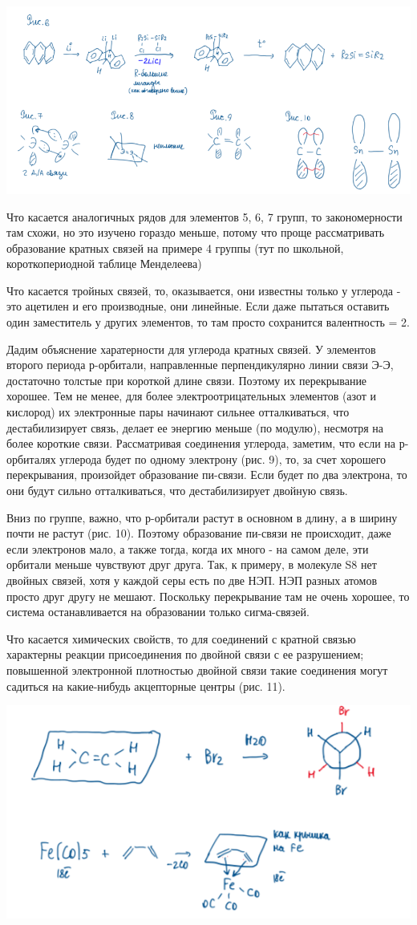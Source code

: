\includegraphics{images/14v3.png}

Что касается аналогичных рядов для элементов 5, 6, 7 групп, то закономерности там схожи, но это изучено гораздо меньше, потому что проще рассматривать образование кратных связей на
примере 4 группы (тут по школьной, короткопериодной таблице Менделеева)

Что касается тройных связей, то, оказывается, они известны только у углерода - это ацетилен и его производные, они линейные. Если даже пытаться оставить один заместитель у других
элементов, то там просто сохранится валентность = 2.

Дадим объяснение харатерности для углерода кратных связей. У элементов второго периода р-орбитали, направленные перпендикулярно линии связи Э-Э, достаточно толстые при короткой длине
связи. Поэтому их перекрывание хорошее. Тем не менее, для более электроотрицательных элементов (азот и кислород) их электронные пары начинают сильнее отталкиваться, что
дестабилизирует связь, делает ее энергию меньше (по модулю), несмотря на более короткие связи. Рассматривая соединения углерода, заметим, что если на р-орбиталях углерода будет по одному
электрону (рис. 9), то, за счет хорошего перекрывания, произойдет образование пи-связи. Если будет по два электрона, то они будут сильно отталкиваться, что дестабилизирует двойную связь.

Вниз по группе, важно, что р-орбитали растут в основном в длину, а в ширину почти не растут (рис. 10). Поэтому образование пи-связи не происходит, даже если электронов мало, а также тогда,
когда их много - на самом деле, эти орбитали меньше чувствуют друг друга. Так, к примеру, в молекуле S8 нет двойных связей, хотя у каждой серы есть по две НЭП. НЭП разных атомов просто
друг другу не мешают. Поскольку перекрывание там не очень хорошее, то система останавливается на образовании только сигма-связей.

Что касается химических свойств, то для соединений с кратной связью характерны реакции присоединения по двойной связи с ее разрушением; повышенной электронной плотностью двойной
связи такие соединения могут садиться на какие-нибудь акцепторные центры (рис. 11).

\includegraphics{images/14v4.png}
